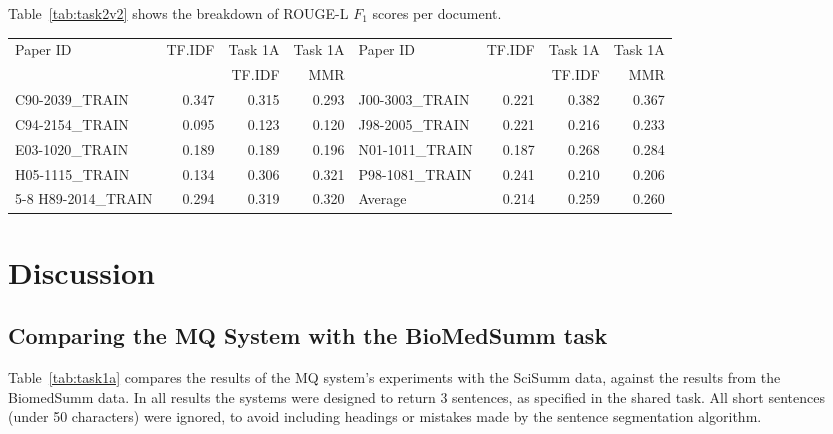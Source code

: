 \documentclass[11pt]{article}
\begin{document}
\noindent{}

Table~\ref{tab:task2v2} shows the breakdown of ROUGE-L $F_1$ scores per
document.

\begin{table*}
  \centering
  \begin{tabular}{|l|r|r|r||l|r|r|r|}
  \hline
	Paper ID & TF.IDF & Task 1A  & Task 1A & 	Paper ID & TF.IDF & Task 1A  & Task 1A  \\
			&	& TF.IDF & MMR & 	&	& TF.IDF & MMR \\
	\hline
	C90-2039\_TRAIN & 0.347 & 0.315 & 0.293 &	J00-3003\_TRAIN & 0.221 & 0.382 & 0.367\\
	C94-2154\_TRAIN & 0.095 & 0.123 & 0.120 & 	J98-2005\_TRAIN & 0.221 & 0.216 & 0.233\\
	E03-1020\_TRAIN & 0.189 & 0.189 & 0.196 &	N01-1011\_TRAIN & 0.187 & 0.268 & 0.284\\
	H05-1115\_TRAIN & 0.134 & 0.306 & 0.321 & 	P98-1081\_TRAIN & 0.241 & 0.210 & 0.206\\
\cline{5-8}
	H89-2014\_TRAIN & 0.294 & 0.319 & 0.320 &	Average & 0.214 & 0.259 & 0.260 \\
	\hline
  \end{tabular}
  \caption{ROUGE-L $F_1$ results for summaries generated by the MQ system.}
  \label{tab:task2v2}
\end{table*}

\section{Discussion}

\subsection{Comparing the MQ System with the BioMedSumm task}
Table~\ref{tab:task1a} compares the results of the MQ system's experiments 
with the SciSumm data, against the results from the BiomedSumm data. In all 
results the systems were designed to return 3 sentences, as specified in the 
shared task. All short sentences (under 50 characters) were ignored, to avoid 
including headings or mistakes made by the sentence segmentation algorithm.
\end{document}
